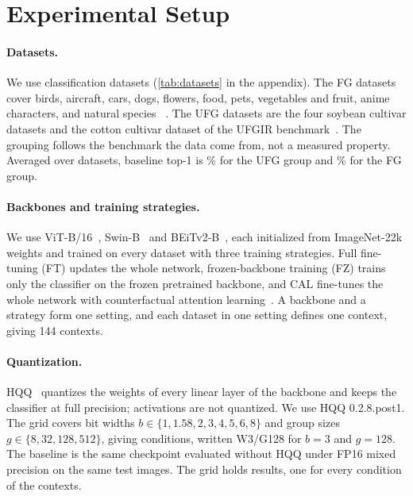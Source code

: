 \section{Experimental Setup}
\label{sec:setup}

\paragraph{Datasets.}
We use  classification datasets (\cref{tab:datasets} in the appendix).
The  FG datasets cover birds, aircraft, cars, dogs, flowers, food, pets, vegetables and fruit, anime characters, and natural species~\cite{wah2011cub,vanhorn2015nabirds,maji2013fine,krause2013cars,khosla2011dogs,nilsback2008flowers,bossard2014food,parkhi2012pets,hou2017vegfru,vanhorn2018inat} .
The  UFG datasets are the four soybean cultivar datasets and the cotton cultivar dataset of the UFGIR benchmark~\cite{yu2021benchmark}.
The grouping follows the benchmark the data come from, not a measured property.
Averaged over datasets, baseline top-1 is \% for the UFG group and \% for the FG group.

\paragraph{Backbones and training strategies.}
We use ViT-B/16~\cite{dosovitskiy2021vit}, Swin-B~\cite{liu2021swin} and BEiTv2-B~\cite{peng2022beitv2}, each initialized from ImageNet-22k weights and trained on every dataset with three training strategies.
Full fine-tuning (FT) updates the whole network, frozen-backbone training (FZ) trains only the classifier on the frozen pretrained backbone, and CAL fine-tunes the whole network with counterfactual attention learning~\cite{rao2021cal}.
A backbone and a strategy form one setting, and each dataset in one setting defines one context, giving 144 contexts.

\paragraph{Quantization.}
HQQ~\cite{badri2023hqq} quantizes the weights of every linear layer of the backbone and keeps the classifier at full precision; activations are not quantized. We use HQQ 0.2.8.post1.
The grid covers bit widths $b \in \{1, 1.58, 2, 3, 4, 5, 6, 8\}$ and group sizes $g \in \{8, 32, 128, 512\}$, giving  conditions, written W3/G128 for $b=3$ and $g=128$.
The baseline is the same checkpoint evaluated without HQQ under FP16 mixed precision on the same test images.
The grid holds  results, one for every condition of the  contexts.


